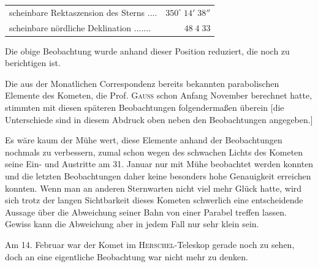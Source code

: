 \begin{center}\fontsize{10}{12}\selectfont\setlength{\tabcolsep}{2pt}\renewcommand{\arraystretch}{1.15}\begin{tabular}{lr}
scheinbare Rektaszension des Sterns .\;.\;.\;.\; & $350^\circ\;14'\;38''$\\
scheinbare nördliche Deklination .\;.\;.\;.\;.\;.\;.\; & $48\;4\;33$\\
\end{tabular}\end{center}

\noindent Die obige Beobachtung wurde anhand dieser Position reduziert, die noch zu berichtigen ist.

\par\indent Die aus der Monatlichen Correspondenz bereits bekannten parabolischen Elemente des Kometen, die Prof. \textsc{Gauss} schon Anfang November berechnet hatte, stimmten mit diesen späteren Beobachtungen folgendermaßen überein [die Unterschiede sind in diesem Abdruck oben neben den Beobachtungen angegeben.]

\par\indent Es wäre kaum der Mühe wert, diese Elemente anhand der Beobachtungen nochmals zu verbessern, zumal schon wegen des schwachen Lichts des Kometen seine Ein- und Austritte am 31. Januar nur mit Mühe beobachtet werden konnten und die letzten Beobachtungen daher keine besonders hohe Genauigkeit erreichen konnten. Wenn man an anderen Sternwarten nicht viel mehr Glück hatte, wird sich trotz der langen Sichtbarkeit dieses Kometen schwerlich eine entscheidende Aussage über die Abweichung seiner Bahn von einer Parabel treffen lassen. Gewiss kann die Abweichung aber in jedem Fall nur sehr klein sein.

\par\indent Am 14. Februar war der Komet im \textsc{Herschel}-Teleskop gerade noch zu sehen, doch an eine eigentliche Beobachtung war nicht mehr zu denken.
